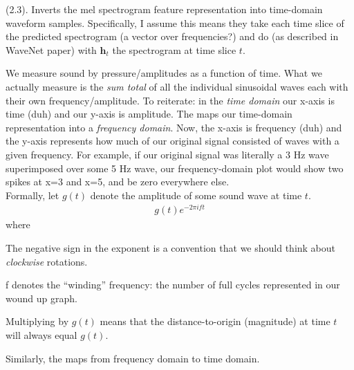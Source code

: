\documentclass[11pt]{article}
\renewcommand\vec[2][]{\bm{#2}_{#1}}
\newcommand\myspace[1][]{\vspace{#1\bigskipamount}}
\newcommand\p{\Needspace{10\baselineskip} \noindent}
\newcommand\bluesec[1]{\myspace \p \blue{#1}}
\begin{document}
\bluesec{WaveNet Vocoder} (2.3). Inverts the mel spectrogram feature representation into time-domain waveform samples. Specifically, I assume this means they take each time slice of the predicted spectrogram (a vector over frequencies?) and do  (as described in WaveNet paper) with $\vec[t]{h}$ the spectrogram at time slice $t$. 

\begin{example}
	We measure sound by pressure/amplitudes as a function of time. What we actually measure is the \textit{sum total} of all the individual sinusoidal waves each with their own frequency/amplitude. To reiterate: in the \textit{time domain} our x-axis is time (duh) and our y-axis is amplitude. The  maps our time-domain representation into a \textit{frequency domain}. Now, the x-axis is frequency (duh) and the y-axis represents how much of our original signal consisted of waves with a given frequency. For example, if our original signal was literally a 3 Hz wave superimposed over some 5 Hz wave, our frequency-domain plot would show two spikes at x=3 and x=5, and be zero everywhere else. \\
	
	Formally, let $g(t)$ denote the amplitude of some sound wave at time $t$.
	\begin{align}
		g(t) e^{-2\pi i f t}
	\end{align}
	where 
	\begin{compactitem}
		\item The negative sign in the exponent is a convention that we should think about \textit{clockwise} rotations. 
		
		\item f denotes the ``winding'' frequency: the number of full cycles represented in our wound up graph. 
		
		\item Multiplying by $g(t)$ means that the distance-to-origin (magnitude) at time $t$ will always equal $g(t)$. 
	\end{compactitem}
	Similarly, the  maps from frequency domain to time domain.
	

\end{example}
\end{document}
